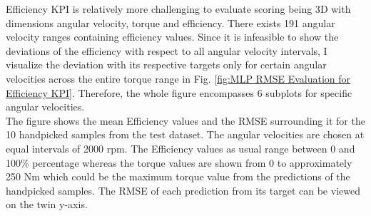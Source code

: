 \documentclass{report} %
\begin{document}
Efficiency \ac{KPI} is relatively more challenging to evaluate scoring being 3\ac{D} with dimensions angular velocity, torque and efficiency. 
There exists 191 angular velocity ranges containing efficiency values.
Since it is infeasible to show the deviations of the efficiency with respect to all angular velocity intervals, I visualize the deviation with its respective targets 
only for certain angular velocities across the entire torque range in Fig. \ref{fig:MLP RMSE Evaluation for Efficiency KPI}. 
Therefore, the whole figure encompasses 6 subplots for specific angular velocities.\\
The figure shows the mean Efficiency values and the \ac{RMSE} surrounding it for the 10 handpicked samples from the test dataset.
The angular velocities are chosen at equal intervals of 2000 rpm. The Efficiency values as usual range between 0 and 100\% percentage whereas the torque values are shown 
from 0 to approximately 250 Nm which could be the maximum torque value from the predictions of the handpicked samples.
The \ac{RMSE} of each prediction from its target can be viewed on the twin y-axis.\\
\end{document}
